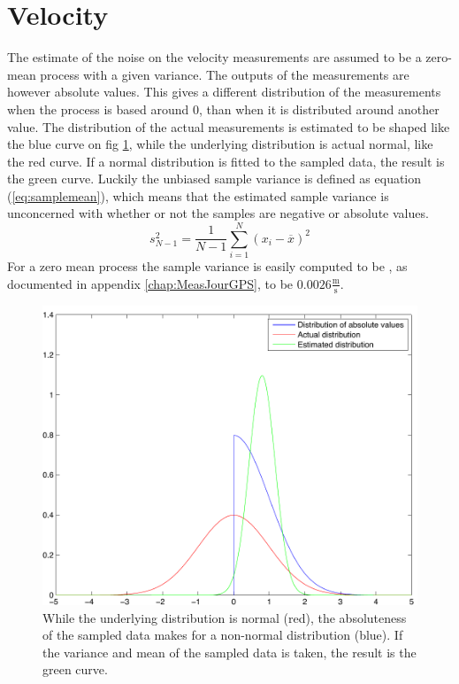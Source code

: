 \section{Velocity}
The estimate of the noise on the velocity measurements are assumed to be a zero-mean process with a given variance. The outputs of the measurements are however absolute values. This gives a different distribution of the measurements when the process is based around 0, than when it is distributed around another value. The distribution of the actual measurements is estimated to be shaped like the blue curve on fig \ref{fig:absdistrib}, while the underlying distribution is actual normal, like the red curve. If a normal distribution is fitted to the sampled data, the result is the green curve. Luckily the unbiased sample variance is defined as equation (\ref{eq:samplemean}), which means that the estimated sample variance is unconcerned with whether or not the samples are negative or absolute values.
\begin{equation}
s^2_{N-1} = \frac{1}{N-1} \sum^N_{i=1}(x_i-\overline{x})^2
\end{equation}
\label{eq:samplemean} For a zero mean process the sample variance is easily computed to be , as documented in appendix \ref{chap:MeasJourGPS}, to be $0.0026\frac{\mathrm{m}}{\mathrm{s}}$.
\begin{figure}[htbp]
	\centering
		\includegraphics[width=\textwidth]{img/absdistrib.pdf}
	\caption{While the underlying distribution is normal (red), the absoluteness of the sampled data makes for a non-normal distribution (blue). If the variance and mean of the sampled data is taken, the result is the green curve.}
	\label{fig:absdistrib}
\end{figure}
